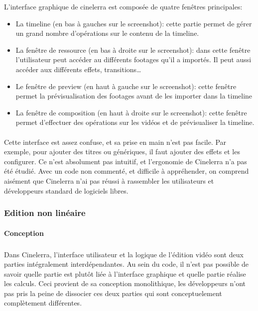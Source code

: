 L'interface graphique de cinelerra est composée de quatre fenêtres
principales:

\begin{itemize}
  \item {La timeline (en bas à gauches sur le screenshot): cette
    partie permet de gérer un grand nombre d'opérations sur le contenu
    de la timeline.}

  \item {La fenêtre de ressource (en bas à droite sur le screenshot):
    dans cette fenêtre l'utilisateur peut accéder au différents
    footages qu'il a importés. Il peut aussi accéder aux différents
    effets, transitions\ldots}

  \item {Le fenêtre de preview (en haut à gauche sur le screenshot):
    cette fenêtre permet la prévisualisation des footages avant de
    les importer dans la timeline}

  \item {La fenêtre de composition (en haut à droite sur le screenshot):
    cette fenêtre permet d'effectuer des opérations sur les vidéos
    et de prévisualiser la timeline.}

\end{itemize}

\paragraph{}

Cette interface est assez confuse, et sa prise en main n'est pas facile.
Par exemple, pour ajouter des titres ou génériques, il faut ajouter des
effets et les configurer. Ce n'est absolument pas intuitif, et l'ergonomie
de Cinelerra n'a pas été étudié. Avec un code non commenté, et
difficile à appréhender, on comprend aisément que Cinelerra n'ai
pas réussi à rassembler les utilisateurs et développeurs standard de
logiciels libres.

\subsubsection{Edition non linéaire}

\paragraph{Conception}

\subparagraph{}

Dans Cinelerra, l'interface utilisateur et la logique de l'édition
vidéo sont deux parties intégralement interdépendantes. Au sein du
code, il n'est pas possible de savoir quelle partie est plutôt liée
à l'interface graphique et quelle partie réalise les calculs. Ceci
provient de sa conception monolithique, les développeurs n'ont pas
pris la peine de dissocier ces deux parties qui sont conceptuelement
complètement différentes.

